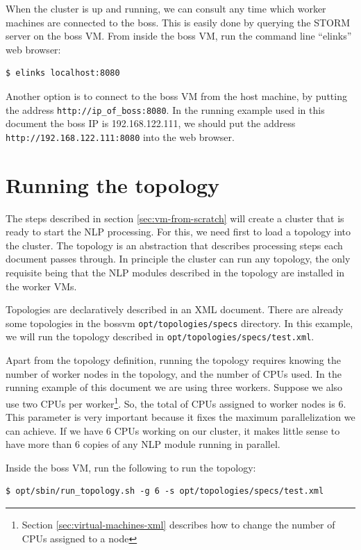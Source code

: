\documentclass[a4]{article}
\begin{document}
When the cluster is up and running, we can consult any time which worker
machines are connected to the boss. This is easily done by querying the
STORM server on the boss VM. From inside the boss VM, run the command line
``elinks'' web browser:

\begin{verbatim}
$ elinks localhost:8080
\end{verbatim}

Another option is to connect to the boss VM from the host machine, by
putting the address \texttt{http://ip\_of\_boss:8080}. In the running example
used in this document the boss IP is 192.168.122.111, we should put the
address \texttt{http://192.168.122.111:8080} into the web browser.

\section{Running the topology}
\label{sec:running-topology}

The steps described in section \ref{sec:vm-from-scratch} will create a
cluster that is ready to start the NLP processing. For this, we need first
to load a topology into the cluster. The topology is an abstraction that
describes processing steps each document passes through. In principle the
cluster can run any topology, the only requisite being that the NLP modules
described in the topology are installed in the worker VMs.

Topologies are declaratively described in an XML document. There are already
some topologies in the bossvm \texttt{opt/topologies/specs} directory. In
this example, we will run the topology described in
\texttt{opt/topologies/specs/test.xml}. 

Apart from the topology definition, running the topology requires knowing
the number of worker nodes in the topology, and the number of CPUs used. In
the running example of this document we are using three workers. Suppose we
also use two CPUs per worker\footnote{Section \ref{sec:virtual-machines-xml}
  describes how to change the number of CPUs assigned to a node}. So, the
total of CPUs assigned to worker nodes is $6$. This parameter is very
important because it fixes the maximum parallelization we can achieve. If we
have 6 CPUs working on our cluster, it makes little sense to have more than
6 copies of any NLP module running in parallel.

Inside the boss VM, run the following to run the topology:

\begin{verbatim}
$ opt/sbin/run_topology.sh -g 6 -s opt/topologies/specs/test.xml
\end{verbatim}
\end{document}
